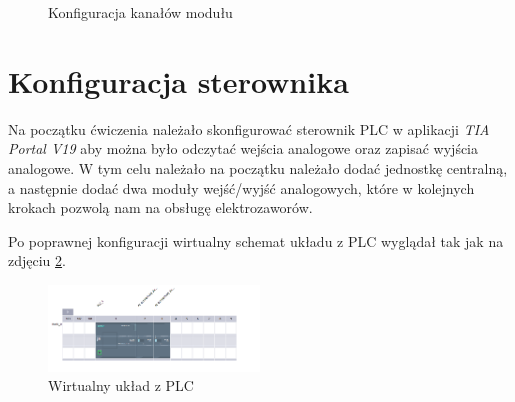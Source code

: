 \documentclass{article}
\begin{document}
\begin{figure}[H]
    \centering
    \caption{Konfiguracja kanałów modułu}
    \label{fig:main0}
\end{figure}


\section{Konfiguracja sterownika}
Na początku ćwiczenia należało skonfigurować sterownik PLC w aplikacji \textit{TIA Portal V19} aby można było odczytać wejścia analogowe oraz zapisać wyjścia analogowe. W tym celu należało na początku należało dodać jednostkę centralną, a następnie dodać dwa moduły wejść/wyjść analogowych, które w kolejnych krokach pozwolą nam na obsługę elektrozaworów.

Po poprawnej konfiguracji wirtualny schemat układu z PLC wyglądał tak jak na zdjęciu \ref{fig:zdj1}.
\begin{figure}[H]
    \centering
    \includegraphics[width=0.5\textwidth]{media/1_1_Dodanie_modułu.png}
    \caption{Wirtualny układ z PLC}
    \label{fig:zdj1}
\end{figure}
\end{document}
